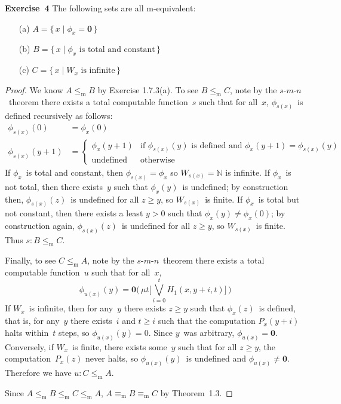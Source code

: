 \documentclass[letterpaper]{article}
\newcommand{\exercise}[2][]{\noindent\textbf{Exercise~{#2}}\ifthenelse{\isempty{#1}}{\textbf{.}}{ ({#1})\textbf{.}}}
\newcommand{\N}{\mathbb{N}}
\newcommand{\mr}{\mathrel{\le_{\mathrm{m}}}}
\newcommand{\me}{\mathrel{\equiv_{\mathrm{m}}}}
\newcommand{\biglor}{\bigvee}
\newcommand{\smn}{$s$-$m$-$n$}
\theoremstyle{plain}
\theoremstyle{definition}
\theoremstyle{remark}
\begin{document}
\exercise{4}
The following sets are all m-equivalent:
\begin{enumerate}[itemsep=0pt]
\item[(a)] $A=\{\,x\mid\phi_x=\mathbf{0}\,\}$
\item[(b)] $B=\{\,x\mid\phi_x\text{ is total and constant}\,\}$
\item[(c)] $C=\{\,x\mid W_x\text{ is infinite}\,\}$
\end{enumerate}
\begin{proof}
We know $A\mr B$ by Exercise 1.7.3(a). To see $B\mr C$, note by the \smn\ theorem there exists a total computable function~$s$ such that for all~$x$, $\phi_{s(x)}$~is defined recursively as follows:
\begin{align*}
\phi_{s(x)}(0)&=\phi_x(0)\\
\phi_{s(x)}(y+1)&=\begin{cases}
\phi_x(y+1)&\text{if }\phi_{s(x)}(y)\text{ is defined and }\phi_x(y+1)=\phi_{s(x)}(y)\\
\text{undefined}&\text{otherwise}
\end{cases}
\end{align*}
If $\phi_x$~is total and constant, then $\phi_{s(x)}=\phi_x$ so $W_{s(x)}=\N$ is infinite. If $\phi_x$~is not total, then there exists~$y$ such that $\phi_x(y)$~is undefined; by construction then, $\phi_{s(x)}(z)$~is undefined for all $z\ge y$, so $W_{s(x)}$~is finite. If $\phi_x$~is total but not constant, then there exists a least $y>0$ such that $\phi_x(y)\ne\phi_x(0)$; by construction again, $\phi_{s(x)}(z)$~is undefined for all $z\ge y$, so $W_{s(x)}$~is finite. Thus $s:B\mr C$.

Finally, to see $C\mr A$, note by the \smn\ theorem there exists a total computable function~$u$ such that for all~$x$,
$$\phi_{u(x)}(y)=\mathbf{0}\bigl(\,\mu t\bigl[\biglor_{i=0}^t H_1(x,y+i,t)\bigr]\,\bigr)$$
If $W_x$~is infinite, then for any~$y$ there exists $z\ge y$ such that $\phi_x(z)$~is defined, that is, for any~$y$ there exists~$i$ and $t\ge i$ such that the computation $P_x(y+i)$ halts within~$t$ steps, so $\phi_{u(x)}(y)=0$. Since $y$~was arbitrary, $\phi_{u(x)}=\mathbf{0}$. Conversely, if $W_x$~is finite, there exists some~$y$ such that for all $z\ge y$, the computation~$P_x(z)$ never halts, so $\phi_{u(x)}(y)$~is undefined and $\phi_{u(x)}\ne\mathbf{0}$. Therefore we have $u:C\mr A$.

Since $A\mr B\mr C\mr A$, $A\me B\me C$ by Theorem~1.3.
\end{proof}
\end{document}
